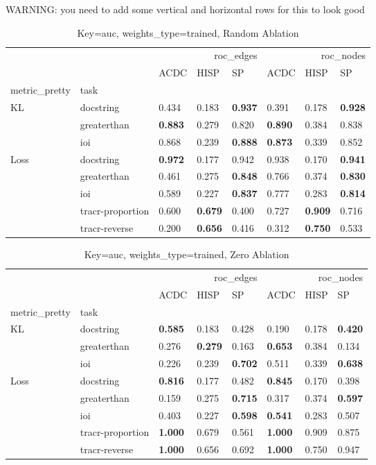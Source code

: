 \documentclass{article}
\begin{document}
WARNING: you need to add some vertical and horizontal rows for this to look good

\begin{table}
\caption{Key=auc, weights\_type=trained, Random Ablation}
\begin{tabular}{llllllll}
\toprule
 &  & \multicolumn{3}{r}{roc\_edges} & \multicolumn{3}{r}{roc\_nodes} \\
 &  & ACDC & HISP & SP & ACDC & HISP & SP \\
metric\_pretty & task &  &  &  &  &  &  \\
\midrule
\multirow[c]{3}{*}{KL} & docstring & 0.434 & 0.183 & \textbf{0.937} & 0.391 & 0.178 & \textbf{0.928} \\
 & greaterthan & \textbf{0.883} & 0.279 & 0.820 & \textbf{0.890} & 0.384 & 0.838 \\
 & ioi & 0.868 & 0.239 & \textbf{0.888} & \textbf{0.873} & 0.339 & 0.852 \\
\multirow[c]{5}{*}{Loss} & docstring & \textbf{0.972} & 0.177 & 0.942 & 0.938 & 0.170 & \textbf{0.941} \\
 & greaterthan & 0.461 & 0.275 & \textbf{0.848} & 0.766 & 0.374 & \textbf{0.830} \\
 & ioi & 0.589 & 0.227 & \textbf{0.837} & 0.777 & 0.283 & \textbf{0.814} \\
 & tracr-proportion & 0.600 & \textbf{0.679} & 0.400 & 0.727 & \textbf{0.909} & 0.716 \\
 & tracr-reverse & 0.200 & \textbf{0.656} & 0.416 & 0.312 & \textbf{0.750} & 0.533 \\
\bottomrule
\end{tabular}
\end{table}
\begin{table}
\caption{Key=auc, weights\_type=trained, Zero Ablation}
\begin{tabular}{llllllll}
\toprule
 &  & \multicolumn{3}{r}{roc\_edges} & \multicolumn{3}{r}{roc\_nodes} \\
 &  & ACDC & HISP & SP & ACDC & HISP & SP \\
metric\_pretty & task &  &  &  &  &  &  \\
\midrule
\multirow[c]{3}{*}{KL} & docstring & \textbf{0.585} & 0.183 & 0.428 & 0.190 & 0.178 & \textbf{0.420} \\
 & greaterthan & 0.276 & \textbf{0.279} & 0.163 & \textbf{0.653} & 0.384 & 0.134 \\
 & ioi & 0.226 & 0.239 & \textbf{0.702} & 0.511 & 0.339 & \textbf{0.638} \\
\multirow[c]{5}{*}{Loss} & docstring & \textbf{0.816} & 0.177 & 0.482 & \textbf{0.845} & 0.170 & 0.398 \\
 & greaterthan & 0.159 & 0.275 & \textbf{0.715} & 0.317 & 0.374 & \textbf{0.597} \\
 & ioi & 0.403 & 0.227 & \textbf{0.598} & \textbf{0.541} & 0.283 & 0.507 \\
 & tracr-proportion & \textbf{1.000} & 0.679 & 0.561 & \textbf{1.000} & 0.909 & 0.875 \\
 & tracr-reverse & \textbf{1.000} & 0.656 & 0.692 & \textbf{1.000} & 0.750 & 0.947 \\
\bottomrule
\end{tabular}
\end{table}
\end{document}
